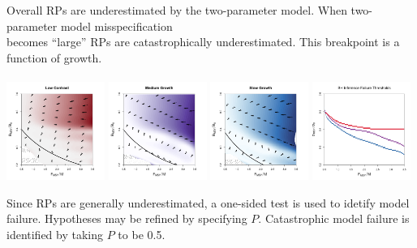 \documentclass[a0paper,portrait]{baposter}
\begin{document}
\begin{poster}
{	%
        \begin{minipage}[h!]{0.74\textwidth}
	\raggedright
	Overall RPs are underestimated by the two-parameter model. When two-parameter model misspecification\\ 
	becomes ``large'' %
	RPs are catastrophically underestimated. This breakpoint is a function of growth.\\$~$\\
	\includegraphics[width=0.24\textwidth]{../../ddBias/directionalBiasDDSubFlatT45N150A0-1AS0.1K10N56Reds 2.png}
	\includegraphics[width=0.24\textwidth]{../../ddBias/directionalBiasDDSubFlatT45N150A0-1AS1K0.5N56Purples.png}
	\includegraphics[width=0.24\textwidth]{../../ddBias/directionalBiasDDSubFlatT45N150A0-1AS2K0.1N84EdgeBlues.png}
	\includegraphics[width=0.24\textwidth]{../../ddBias/relErrorImagesBHDD0.5.png}	
	
	\vspace{0.2cm}
	Since RPs are generally underestimated, a one-sided test is used to idetify model failure. %
	Hypotheses may be refined by specifying $P$.
	Catastrophic model failure is identified by taking $P$ to be 0.5. 


\end{minipage}}
\end{poster}
\end{document}
